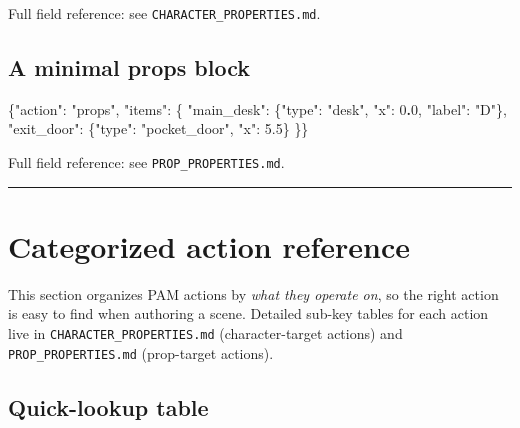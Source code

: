 \documentclass[
  12pt,
  letterpaper,
]{book}
\newenvironment{Shaded}{}{}
\newcommand{\DataTypeTok}[1]{\textcolor[rgb]{0.56,0.13,0.00}{#1}}
\newcommand{\DecValTok}[1]{\textcolor[rgb]{0.25,0.63,0.44}{#1}}
\newcommand{\ErrorTok}[1]{\textcolor[rgb]{1.00,0.00,0.00}{\textbf{#1}}}
\newcommand{\FloatTok}[1]{\textcolor[rgb]{0.25,0.63,0.44}{#1}}
\newcommand{\FunctionTok}[1]{\textcolor[rgb]{0.02,0.16,0.49}{#1}}
\newcommand{\StringTok}[1]{\textcolor[rgb]{0.25,0.44,0.63}{#1}}
\begin{document}
Full field reference: see \texttt{CHARACTER\_PROPERTIES.md}.

\subsection{A minimal props block}\label{a-minimal-props-block}

\begin{Shaded}
\begin{Highlighting}[]
\FunctionTok{\{}\DataTypeTok{"action"}\FunctionTok{:} \StringTok{"props"}\FunctionTok{,} \DataTypeTok{"items"}\FunctionTok{:} \FunctionTok{\{}
  \DataTypeTok{"main\_desk"}\FunctionTok{:} \FunctionTok{\{}\DataTypeTok{"type"}\FunctionTok{:} \StringTok{"desk"}\FunctionTok{,}     \DataTypeTok{"x"}\FunctionTok{:}  \DecValTok{0}\ErrorTok{.}\DecValTok{0}\FunctionTok{,} \DataTypeTok{"label"}\FunctionTok{:} \StringTok{"D"}\FunctionTok{\},}
  \DataTypeTok{"exit\_door"}\FunctionTok{:} \FunctionTok{\{}\DataTypeTok{"type"}\FunctionTok{:} \StringTok{"pocket\_door"}\FunctionTok{,} \DataTypeTok{"x"}\FunctionTok{:} \FloatTok{5.5}\FunctionTok{\}}
\FunctionTok{\}\}}
\end{Highlighting}
\end{Shaded}

Full field reference: see \texttt{PROP\_PROPERTIES.md}.

\begin{center}\rule{0.5\linewidth}{0.5pt}\end{center}

\section{Categorized action
reference}\label{categorized-action-reference}

This section organizes PAM actions by \emph{what they operate on}, so
the right action is easy to find when authoring a scene. Detailed
sub-key tables for each action live in \texttt{CHARACTER\_PROPERTIES.md}
(character-target actions) and \texttt{PROP\_PROPERTIES.md} (prop-target
actions).

\subsection{Quick-lookup table}\label{quick-lookup-table}
\end{document}
